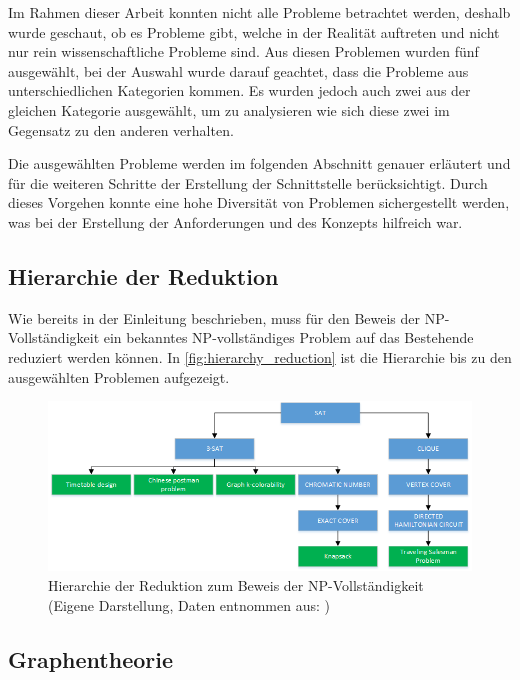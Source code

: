 Im Rahmen dieser Arbeit konnten nicht alle Probleme betrachtet werden, deshalb wurde geschaut, ob es Probleme gibt, welche in der Realität auftreten und nicht nur rein wissenschaftliche 
Probleme sind. Aus diesen Problemen wurden fünf ausgewählt, bei der Auswahl wurde darauf geachtet, dass die Probleme aus unterschiedlichen Kategorien kommen. Es wurden jedoch 
auch zwei aus der gleichen Kategorie ausgewählt, um zu analysieren wie sich diese zwei im Gegensatz zu den anderen verhalten. 

Die ausgewählten Probleme werden im folgenden Abschnitt genauer erläutert und für die weiteren Schritte der Erstellung der Schnittstelle berücksichtigt. Durch dieses Vorgehen konnte eine 
hohe Diversität von Problemen sichergestellt werden, was bei der Erstellung der Anforderungen und des Konzepts hilfreich war.

\subsection{Hierarchie der Reduktion}\label{hierarchy_reduction}
Wie bereits in der Einleitung beschrieben, muss für den Beweis der NP-Vollständigkeit ein bekanntes NP-vollständiges Problem auf das Bestehende reduziert werden können. In 
\autoref{fig:hierarchy_reduction} ist die Hierarchie bis zu den ausgewählten Problemen aufgezeigt.

\begin{figure}[h]
\centering 
\includegraphics[scale=0.75]{images/visio/problem_hierarchy.png}
\caption[Hierarchie der Reduktion zum Beweis der NP-Vollständigkeit]{Hierarchie der Reduktion zum Beweis der NP-Vollständigkeit (Eigene Darstellung, Daten entnommen aus: 
\cite{garey1979computers})}
\label{fig:hierarchy_reduction}
\end{figure}

\subsection{Graphentheorie}\label{graph_theory}

